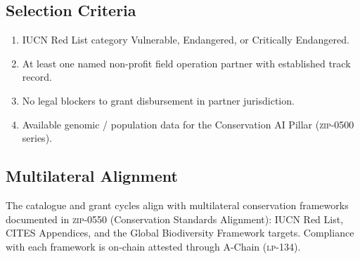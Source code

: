 \subsection{Selection Criteria}

\begin{enumerate}[nosep,leftmargin=1.4em]
\item IUCN Red List category Vulnerable, Endangered, or Critically
  Endangered.
\item At least one named non-profit field operation partner with
  established track record.
\item No legal blockers to grant disbursement in partner jurisdiction.
\item Available genomic / population data for the Conservation AI
  Pillar (\textsc{zip-0500} series).
\end{enumerate}

\subsection{Multilateral Alignment}

The catalogue and grant cycles align with multilateral conservation
frameworks documented in \textsc{zip-0550} (Conservation Standards
Alignment): IUCN Red List, CITES Appendices, and the Global Biodiversity
Framework targets. Compliance with each framework is on-chain
attested through A-Chain (\textsc{lp-134}).
